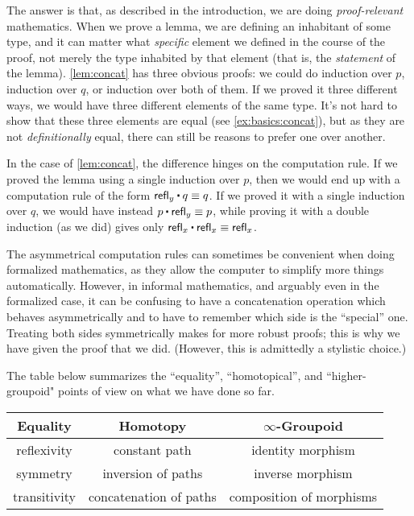 The answer is that, as described in the introduction, we are doing \emph{proof-relevant} mathematics.
%
When we prove a lemma, we are defining an inhabitant of some type, and it can matter what \emph{specific} element we defined in the course of the proof, not merely the type inhabited by that element (that is, the \emph{statement} of the lemma).
\cref{lem:concat} has three obvious proofs: we could do induction over $p$, induction over $q$, or induction over both of them.
If we proved it three different ways, we would have three different elements of the same type.
It's not hard to show that these three elements are equal (see \cref{ex:basics:concat}), but as they are not \emph{definitionally} equal, there can still be reasons to prefer one over another.

In the case of \cref{lem:concat}, the difference hinges on the computation rule.
If we proved the lemma using a single induction over $p$, then we would end up with a computation rule of the form $\refl{y} \ct q \jdeq q$.
If we proved it with a single induction over $q$, we would have instead $p\ct\refl{y}\jdeq p$, while proving it with a double induction (as we did) gives only $\refl{x}\ct\refl{x} \jdeq \refl{x}$.

%
The asymmetrical computation rules can sometimes be convenient when doing formalized mathematics, as they allow the computer to simplify more things automatically.
However, in informal mathematics, and arguably even in the formalized case, it can be confusing to have a concatenation operation which behaves asymmetrically and to have to remember which side is the ``special'' one.
Treating both sides symmetrically makes for more robust proofs; this is why we have given the proof that we did.
(However, this is admittedly a stylistic choice.)

The table below summarizes the ``equality'', ``homotopical'', and ``higher-groupoid" points of view on what we have done so far.
\begin{center}
  \medskip
  \begin{tabular}{ccc}
    \toprule
    Equality & Homotopy & $\infty$-Groupoid\\
    \midrule
    reflexivity\index{equality!reflexivity of} & constant path & identity morphism\\
    symmetry\index{equality!symmetry of} & inversion of paths & inverse morphism\\
    transitivity\index{equality!transitivity of} & concatenation of paths & composition of morphisms\\
    \bottomrule
  \end{tabular}
  \medskip
\end{center}

